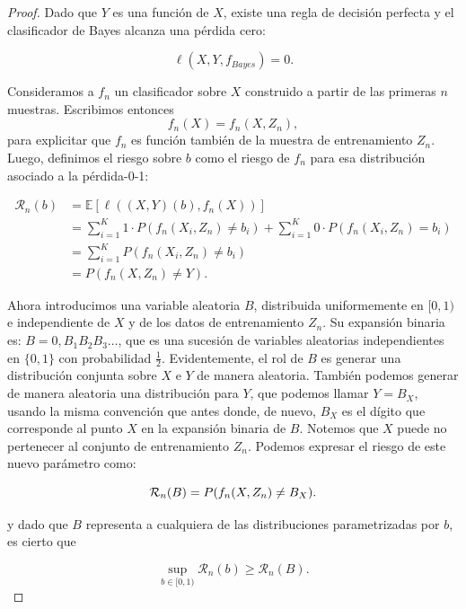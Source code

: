 \documentclass{article}
\begin{document}
\begin{proof}
Dado que \(Y\) es una función de \(X\), existe una regla de decisión perfecta y el clasificador de Bayes alcanza una pérdida cero:

\[
\ell(X,Y,f_{Bayes}) = 0.
\]

Consideramos a $f_n$ un clasificador sobre $X$ construido a partir de las primeras $n$ muestras. Escribimos entonces
\[
f_n(X) = f_n(X, Z_n),
\]
para explicitar que $f_n$ es función también de la muestra de entrenamiento $Z_n$. Luego, definimos el riesgo sobre \(b\)
como el riesgo de $f_n$ para esa distribución asociado a la pérdida-0-1:


\begin{equation*}
    \begin{aligned}
        \mathcal{R}_n(b) &= \mathbb{E}[\ell((X,Y)(b),f_n(X))]\\ 
        &= \sum_{i=1}^{K} 1 \cdot P(f_n(X_i, Z_n) \neq b_{i}) + \sum_{i=1}^{K} 0 \cdot P(f_n(X_i, Z_n) = b_{i})\\
        &= \sum_{i=1}^{K} P(f_n(X_i, Z_n) \neq b_{i}) \\
        &= P(f_n(X, Z_n) \neq Y).
    \end{aligned}
\end{equation*}


Ahora introducimos una variable aleatoria \(B\), distribuida uniformemente en \([0,1)\) e independiente de \(X\) y 
de los datos de entrenamiento \(Z_n\). Su expansión binaria es: \(B = 0,B_1B_2B_3\dots\), que es una sucesión 
de variables aleatorias independientes en \(\{0,1\}\) con probabilidad $\frac{1}{2}$. Evidentemente, el rol de $B$
es generar una distribución conjunta sobre $X$ e $Y$ de manera aleatoria. También podemos generar de manera aleatoria
una distribución para $Y$, que podemos llamar $Y=B_X$, usando la misma convención que antes donde, de nuevo,
$B_X$ es el dígito que corresponde al punto $X$ en la expansión binaria de $B$. Notemos que $X$ puede no pertenecer
al conjunto de entrenamiento $Z_n$. \newline
Podemos expresar el riesgo de este nuevo parámetro como:


\[
\mathcal{R}_n(B) = P(f_n(X, Z_n) \neq B_X).\newline
\]

y dado que $B$ representa a cualquiera de las distribuciones parametrizadas por $b$, es cierto que

\begin{equation}
    \sup_{b\in[0,1)} \mathcal{R}_n(b) \geq \mathcal{R}_n(B). \label{eq:cota_parametro_b_distribuciones}
\end{equation}




\end{proof}
\end{document}
